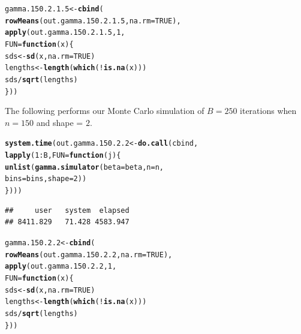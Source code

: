 \documentclass[11pt]{article}\usepackage[]{graphicx}\usepackage[]{color}
\makeatletter
\newcommand{\hlnum}[1]{\textcolor[rgb]{0.686,0.059,0.569}{#1}}%
\newcommand{\hlopt}[1]{\textcolor[rgb]{0,0,0}{#1}}%
\newcommand{\hlstd}[1]{\textcolor[rgb]{0.345,0.345,0.345}{#1}}%
\newcommand{\hlkwa}[1]{\textcolor[rgb]{0.161,0.373,0.58}{\textbf{#1}}}%
\newcommand{\hlkwb}[1]{\textcolor[rgb]{0.69,0.353,0.396}{#1}}%
\newcommand{\hlkwc}[1]{\textcolor[rgb]{0.333,0.667,0.333}{#1}}%
\newcommand{\hlkwd}[1]{\textcolor[rgb]{0.737,0.353,0.396}{\textbf{#1}}}%
\newenvironment{kframe}{%
 \def\at@end@of@kframe{}%
 \ifinner\ifhmode%
  \def\at@end@of@kframe{\end{minipage}}%
  \begin{minipage}{\columnwidth}%
 \fi\fi%
 \def\FrameCommand##1{\hskip\@totalleftmargin \hskip-\fboxsep
 \colorbox{shadecolor}{##1}\hskip-\fboxsep
     \hskip-\linewidth \hskip-\@totalleftmargin \hskip\columnwidth}%
 \MakeFramed {\advance\hsize-\width
   \@totalleftmargin\z@ \linewidth\hsize
   \@setminipage}}%
 {\par\unskip\endMakeFramed%
 \at@end@of@kframe}
\newenvironment{knitrout}{}{} %
\makeatother
\begin{document}
\begin{knitrout}
\color{fgcolor}\begin{kframe}
\begin{alltt}
\hlstd{gamma.150.2.1.5} \hlkwb{<-} \hlkwd{cbind}\hlstd{(}
  \hlkwd{rowMeans}\hlstd{(out.gamma.150.2.1.5,} \hlkwc{na.rm} \hlstd{=} \hlnum{TRUE}\hlstd{),}
  \hlkwd{apply}\hlstd{(out.gamma.150.2.1.5,} \hlnum{1}\hlstd{,}
  \hlkwc{FUN} \hlstd{=} \hlkwa{function}\hlstd{(}\hlkwc{x}\hlstd{)\{}
    \hlstd{sds} \hlkwb{<-} \hlkwd{sd}\hlstd{(x,} \hlkwc{na.rm} \hlstd{=} \hlnum{TRUE}\hlstd{)}
    \hlstd{lengths} \hlkwb{<-} \hlkwd{length}\hlstd{(}\hlkwd{which}\hlstd{(}\hlopt{!}\hlkwd{is.na}\hlstd{(x)))}
    \hlstd{sds} \hlopt{/} \hlkwd{sqrt}\hlstd{(lengths)}
  \hlstd{\}))}
\end{alltt}
\end{kframe}
\end{knitrout}

The following performs our Monte Carlo simulation of $B = 250$ iterations 
when $n = 150$ and shape = $2$.

\begin{knitrout}
\color{fgcolor}\begin{kframe}
\begin{alltt}
\hlkwd{system.time}\hlstd{(out.gamma.150.2.2} \hlkwb{<-} \hlkwd{do.call}\hlstd{(cbind,}
  \hlkwd{lapply}\hlstd{(}\hlnum{1}\hlopt{:}\hlstd{B,} \hlkwc{FUN} \hlstd{=} \hlkwa{function}\hlstd{(}\hlkwc{j}\hlstd{)\{}
    \hlkwd{unlist}\hlstd{(}\hlkwd{gamma.simulator}\hlstd{(}\hlkwc{beta} \hlstd{= beta,} \hlkwc{n} \hlstd{= n,}
      \hlkwc{bins} \hlstd{= bins,} \hlkwc{shape} \hlstd{=} \hlnum{2}\hlstd{))}
\hlstd{\})))}
\end{alltt}
\begin{verbatim}
##     user   system  elapsed 
## 8411.829   71.428 4583.947
\end{verbatim}
\end{kframe}
\end{knitrout}

\begin{knitrout}
\color{fgcolor}\begin{kframe}
\begin{alltt}
\hlstd{gamma.150.2.2} \hlkwb{<-} \hlkwd{cbind}\hlstd{(}
  \hlkwd{rowMeans}\hlstd{(out.gamma.150.2.2,} \hlkwc{na.rm} \hlstd{=} \hlnum{TRUE}\hlstd{),}
  \hlkwd{apply}\hlstd{(out.gamma.150.2.2,} \hlnum{1}\hlstd{,}
  \hlkwc{FUN} \hlstd{=} \hlkwa{function}\hlstd{(}\hlkwc{x}\hlstd{)\{}
    \hlstd{sds} \hlkwb{<-} \hlkwd{sd}\hlstd{(x,} \hlkwc{na.rm} \hlstd{=} \hlnum{TRUE}\hlstd{)}
    \hlstd{lengths} \hlkwb{<-} \hlkwd{length}\hlstd{(}\hlkwd{which}\hlstd{(}\hlopt{!}\hlkwd{is.na}\hlstd{(x)))}
    \hlstd{sds} \hlopt{/} \hlkwd{sqrt}\hlstd{(lengths)}
  \hlstd{\}))}
\end{alltt}
\end{kframe}
\end{knitrout}
\end{document}
